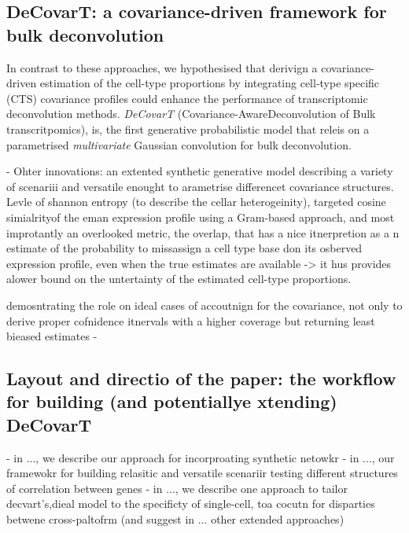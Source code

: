 \documentclass[pdflatex, sn-nature]{sn-jnl}
\theoremstyle{thmstyleone}%
\theoremstyle{thmstyletwo}%
\theoremstyle{thmstylethree}%
\begin{document}
     \subsection{DeCovarT: a covariance-driven framework for bulk deconvolution}

     In contrast to these approaches, we hypothesised that derivign a covariance-driven 
     estimation of the cell-type proportions by integrating cell-type specific (CTS) covariance profiles
      could enhance the performance of transcriptomic deconvolution methods.
      \emph{DeCovarT} (Covariance-AwareDeconvolution of Bulk transcritpomics), is, the first generative probabilistic model that releis on a parametrised
      \emph{multivariate} Gaussian convolution for bulk deconvolution. 
    
    - Ohter innovations: an extented synthetic generative model describing a variety of scenariii and versatile enought to arametrise
    differencet covariance structures. Levle of shannon entropy (to describe the cellar heterogeinity), targeted cosine simialrityof the eman expression profile
    using a Gram-based approach, and most improtantly an overlooked metric, the overlap, that has a nice itnerpretion as a n estimate of the probability to missassign
    a cell type base don its osberved expression profile, even when the true estimates are available -> it hus provides alower bound on the untertainty of the estimated cell-type proportions.


    
    demosntrating the role on ideal cases of accoutnign for the covariance, not only to derive proper cofnidence itnervals 
    with a higher coverage  but returning least bieased estimates
    - 
    \subsection{Layout and directio of the paper: the workflow for building (and potentiallye xtending) DeCovarT}

    - in ..., we describe our approach for incorproating synthetic netowkr
    - in ..., our framewokr for building relasitic and versatile scenariir testing different structures of correlation between genes
    - in ..., we describe one approach to tailor decvart's,dieal model to the specificty of single-cell, toa cocutn for disparties betwene cross-paltofrm
    (and suggest in ... other extended approaches)
\end{document}
